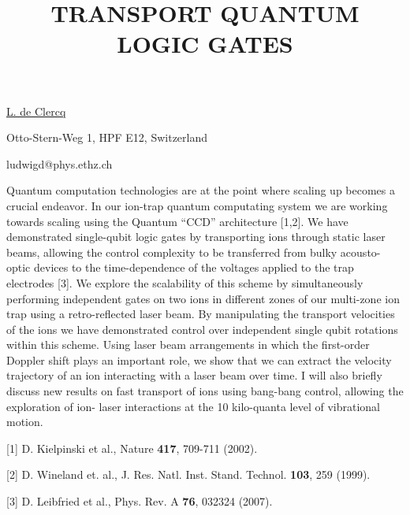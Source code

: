\title{TRANSPORT QUANTUM LOGIC GATES}

\underline{L. de Clercq} 

{\normalsize{\vspace{-4mm}
Otto-Stern-Weg 1, HPF E12, Switzerland

\email ludwigd@phys.ethz.ch}}

Quantum computation technologies are at the point where scaling up becomes a crucial endeavor.
In our ion-trap quantum computating system we are working towards scaling using the Quantum
``CCD'' architecture [1,2]. We have demonstrated single-qubit logic gates by transporting ions
through static laser beams, allowing the control complexity to be transferred from bulky
acousto-optic devices to the time-dependence of the voltages applied to the trap electrodes
[3]. We explore the scalability of this scheme by simultaneously performing independent gates
on two ions in different zones of our multi-zone ion trap using a retro-reflected laser beam.
By manipulating the transport velocities of the ions we have demonstrated control over
independent single qubit rotations within this scheme. Using laser beam arrangements in which
the first-order Doppler shift plays an important role, we show that we can extract the velocity
trajectory of an ion interacting with a laser beam over time. I will also briefly discuss new
results on fast transport of ions using bang-bang control, allowing the exploration of ion-
laser interactions at the 10 kilo-quanta level of vibrational motion.

{\normalsize
[1] D. Kielpinski et al., Nature \textbf{417}, 709-711 (2002).
\vsp

[2] D. Wineland et. al., J. Res. Natl. Inst. Stand. Technol. \textbf{103}, 259 (1999).
\vsp

[3] D. Leibfried et al., Phys. Rev. A \textbf{76}, 032324 (2007).
}


\vspace{\baselineskip}
